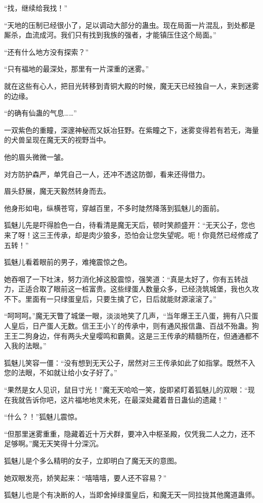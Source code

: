 \begin{this_body}
“找，继续给我找！”

“天地的压制已经很小了，足以调动大部分的蛊虫。现在局面一片混乱，到处都是厮杀，血流成河。我们只有找到我族的强者，才能镇压住这个局面。”

“还有什么地方没有探索？”

“只有福地的最深处，那里有一片深重的迷雾。”

就在这些有心人，把目光转移到青铜大殿的时候，魔无天已经独自一人，来到迷雾的边缘。

“的确有仙蛊的气息……”

一双紫色的重瞳，深邃神秘而又妖冶狂野。在紫瞳之下，迷雾变得若有若无，海量的犬兽呈现在魔无天的视野当中。

他的眉头微微一皱。

对方防护森严，单凭自己一人，还冲不透这防御，看来还得借力。

眉头舒展，魔无天毅然转身而去。

他身形如电，纵横苍穹，穿越百里，不多时陡然降落到狐魅儿的面前。

狐魅儿先是吓得脸色一白，待看清是魔无天后，顿时笑颜盛开：“无天公子，您也来了呀！这三王传承，却是肉少狼多，恐怕会让您失望呢。呃！你竟然已经修成了五转！”

狐魅儿看着眼前的男子，难掩震惊之色。

她吞咽了一下吐沫，努力消化掉这股震惊，强笑道：“真是太好了，你有五转战力，正适合取了眼前这一桩富贵。这些绿蛋人数量众多，已经浇筑城堡，我也久攻不下。里面有一只绿蛋皇后，只要生擒了它，日后就能财源滚滚了。”

“呵呵呵。”魔无天瞥了城堡一眼，淡淡地笑了几声，“当年爆王王八蛋，拥有八只蛋人皇后，日产蛋人无数。信王王小丫的传承中，则有通风报信蛊、百战不殆蛊。狗王王二狗身边，伴有两头犬皇嘤鸣和霸黄。这是三王传承的精髓所在，但通通都不入我的法眼。”

狐魅儿笑容一僵：“没有想到无天公子，居然对三王传承如此了如指掌。既然不入您的法眼，不如就让给小女子好了。”

“果然是女人见识，鼠目寸光！”魔无天哈哈一笑，旋即紧盯着狐魅儿的双眼：“现在我就告诉你吧，这片福地地灵未死，在最深处藏着昔日蛊仙的遗藏！”

“什么？！”狐魅儿震惊。

“但那里迷雾重重，隐藏着近十万犬群，要冲入中枢圣殿，仅凭我二人之力，还不足够啊。”魔无天笑得十分深沉。

狐魅儿是个多么精明的女子，立即明白了魔无天的意图。

她双眼发亮，娇笑起来：“嘻嘻嘻，要人还不容易？”

狐魅儿也是个有决断的人，当即舍掉绿蛋皇后，和魔无天一同拉拢其他魔道蛊师。


\end{this_body}
